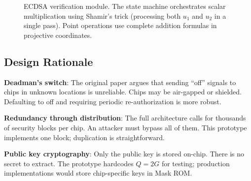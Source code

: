\documentclass[11pt]{article}
\begin{document}
\begin{figure}[h]
\begin{center}
\caption{ECDSA verification module. The state machine orchestrates scalar multiplication using Shamir's trick (processing both $u_1$ and $u_2$ in a single pass). Point operations use complete addition formulas in projective coordinates.}
\label{fig:ecdsa}
\end{center}
\end{figure}

\subsection{Design Rationale}

\textbf{Deadman's switch}: The original paper \cite{petrie2025} argues that sending ``off'' signals to chips in unknown locations is unreliable. Chips may be air-gapped or shielded. Defaulting to off and requiring periodic re-authorization is more robust.

\textbf{Redundancy through distribution}: The full architecture calls for thousands of security blocks per chip. An attacker must bypass all of them. This prototype implements one block; duplication is straightforward.

\textbf{Public key cryptography}: Only the public key is stored on-chip. There is no secret to extract. The prototype hardcodes $Q = 2G$ for testing; production implementations would store chip-specific keys in Mask ROM.
\end{document}
